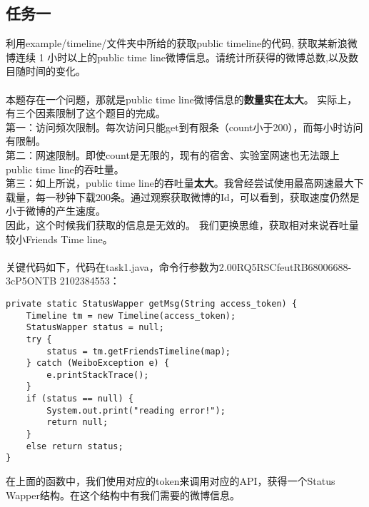 \documentclass{article}
\begin{document}
\subsection{任务一}
利用example/timeline/文件夹中所给的获取public timeline的代码,
获取某新浪微博连续 1 小时以上的public time line微博信息。请统计所获得的微博总数,以及数目随时间的变化。\\\\
本题存在一个问题，那就是public time line微博信息的\textbf{数量实在太大}。
实际上，有三个因素限制了这个题目的完成。\\
第一：访问频次限制。每次访问只能get到有限条（count小于200），而每小时访问有限制。\\
第二：网速限制。即使count是无限的，现有的宿舍、实验室网速也无法跟上public time line的吞吐量。\\
第三：如上所说，public time line的吞吐量\textbf{太大}。我曾经尝试使用最高网速最大下载量，每一秒钟下载200条。通过观察获取微博的Id，可以看到，获取速度仍然是小于微博的产生速度。\\
因此，这个时候我们获取的信息是无效的。
我们更换思维，获取相对来说吞吐量较小Friends Time line。\\
\\
关键代码如下，代码在task1.java，命令行参数为2.00RQ5RSCfeutRB68006688-3cP5ONTB 2102384553：
\begin{lstlisting}
private static StatusWapper getMsg(String access_token) {
	Timeline tm = new Timeline(access_token);
	StatusWapper status = null;
	try {
		status = tm.getFriendsTimeline(map);
	} catch (WeiboException e) {
		e.printStackTrace();
	}
	if (status == null) {
		System.out.print("reading error!");
		return null;
	}
	else return status;
}
\end{lstlisting}
在上面的函数中，我们使用对应的token来调用对应的API，获得一个Status\\Wapper结构。在这个结构中有我们需要的微博信息。
\end{document}
